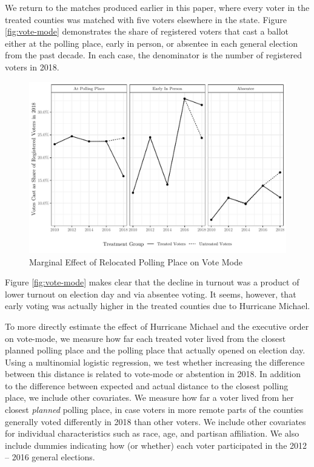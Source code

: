 \documentclass[
  12pt,
]{article}
\begin{document}
We return to the matches produced earlier in this paper, where every voter in the treated counties was matched with five voters elsewhere in the state. Figure \ref{fig:vote-mode} demonstrates the share of registered voters that cast a ballot either at the polling place, early in person, or absentee in each general election from the past decade. In each case, the denominator is the number of registered voters in 2018.

\begin{figure}[h]

{\centering \includegraphics{hurricane_michael_files/figure-latex/vote-mode-chunk-1} 

}

\caption{\label{fig:vote-mode}Marginal Effect of Relocated Polling Place on Vote Mode}\label{fig:vote-mode-chunk}
\end{figure}

Figure \ref{fig:vote-mode} makes clear that the decline in turnout was a product of lower turnout on election day and via absentee voting. It seems, however, that early voting was actually higher in the treated counties due to Hurricane Michael.

To more directly estimate the effect of Hurricane Michael and the executive order on vote-mode, we measure how far each treated voter lived from the closest planned polling place and the polling place that actually opened on election day. Using a multinomial logistic regression, we test whether increasing the difference between this distance is related to vote-mode or abstention in 2018. In addition to the difference between expected and actual distance to the closest polling place, we include other covariates. We measure how far a voter lived from her closest \emph{planned} polling place, in case voters in more remote parts of the counties generally voted differently in 2018 than other voters. We include other covariates for individual characteristics such as race, age, and partisan affiliation. We also include dummies indicating how (or whether) each voter participated in the 2012 -- 2016 general elections.
\end{document}
